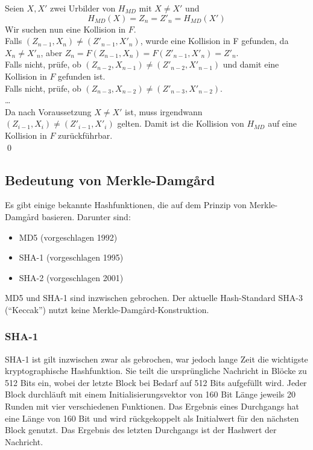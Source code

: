 \begin{beweis}
Seien $X, X'$ zwei Urbilder von $H_{MD}$ mit $X \not = X'$ und
\begin{equation*}
H_{MD}(X) = Z_{n} = Z'_{n} = H_{MD}(X')
\end{equation*}
Wir suchen nun eine Kollision in $F$.\\
Falls $(Z_{n-1}, X_n) \not = (Z'_{n-1}, X'_n)$, wurde eine Kollision in F gefunden, da $X_n \not = X'_n$, aber $Z_{n} = F(Z_{n-1}, X_{n}) = F(Z'_{n-1},
X'_{n}) = Z'_{n}$.\\
Falls nicht, prüfe, ob $(Z_{n-2}, X_{n-1}) \not = (Z'_{n-2}, X'_{n-1})$ und damit eine Kollision in $F$ gefunden ist.\\
Falls nicht, prüfe, ob $(Z_{n-3}, X_{n-2}) \not = (Z'_{n-3}, X'_{n-2})$. \\
\ldots\\
Da nach Voraussetzung $X \not = X'$ ist, muss irgendwann $(Z_{i-1}, X_{i}) \not = (Z'_{i-1}, X'_{i})$ gelten. Damit ist die Kollision von $H_{MD}$ auf eine
Kollision in $F$ zurückführbar.\\
\qed
\end{beweis}

\subsection{Bedeutung von Merkle-Damgård}
Es gibt einige bekannte Hashfunktionen, die auf dem Prinzip von Merkle-Damgård basieren. Darunter sind:
\begin{itemize}
  \item MD5 (vorgeschlagen 1992)
  \item SHA-1 (vorgeschlagen 1995)
  \item SHA-2 (vorgeschlagen 2001)
\end{itemize}
MD5 und SHA-1 sind inzwischen gebrochen. Der aktuelle Hash-Standard SHA-3 ("`Keccak"') nutzt keine Merkle-Damgård-Konstruktion.

\subsubsection{SHA-1}
SHA-1 ist gilt inzwischen zwar als gebrochen, war jedoch lange Zeit die wichtigste kryptographische Hashfunktion. Sie teilt die ursprüngliche Nachricht in
Blöcke zu 512 Bits ein, wobei der letzte Block bei Bedarf auf 512 Bits aufgefüllt wird. Jeder Block durchläuft mit einem Initialisierungsvektor von 160 Bit
Länge jeweils 20 Runden mit vier verschiedenen Funktionen. Das Ergebnis eines Durchgangs hat eine Länge von 160 Bit und wird rückgekoppelt als Initialwert für
den nächsten Block genutzt. Das Ergebnis des letzten Durchgangs ist der Hashwert der Nachricht.

